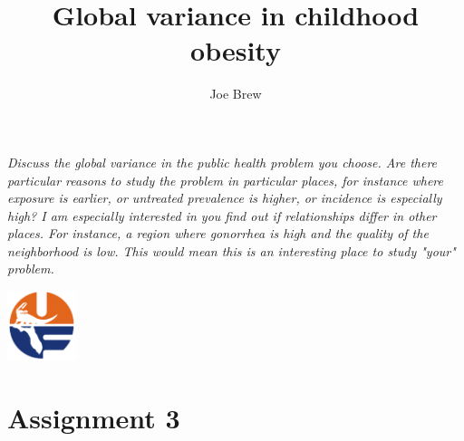 \documentclass[11pt]{article}
\begin{document}


\title{\textbf{Global variance in childhood obesity}}
\author{Joe Brew}


\maketitle

\emph{
Discuss the global variance in the public health problem you choose.  Are there particular reasons to study the problem in particular places, for instance where exposure is earlier, or untreated prevalence is higher, or incidence is especially high? I am especially interested in you find out if  relationships differ in other places.  For instance, a region where gonorrhea is high and the quality of the neighborhood is low.  This would mean this is an interesting place to study "your" problem.
}
\tableofcontents

\vspace{20mm}

\begin{center}
\includegraphics[width=2cm]{uf}
\end{center}


\fancyhfoffset[E,O]{0pt}




\section*{Assignment 3}
\hrulefill
\end{document}
